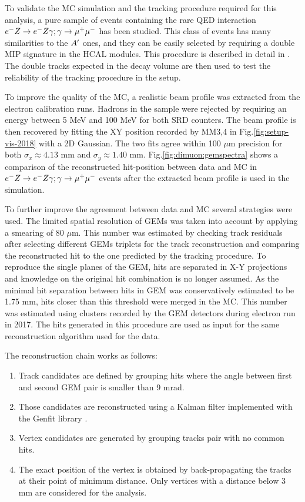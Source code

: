 To validate the MC simulation and the tracking procedure required for this analysis, a pure sample of events containing the rare QED interaction $e^- Z \to e^- Z \gamma; \gamma \to \mu^+ \mu^-$ has been studied. This class of events has many similarities to the $A'$ ones, and they can be easily selected by requiring a double MIP signature in the HCAL modules. This procedure is described in detail in \cite{na64-prd}. The double tracks expected in the decay volume are then used to test the reliability of the tracking procedure in the setup.

To improve the quality of the MC, a realistic beam profile was extracted from the electron calibration runs. Hadrons in the sample were rejected by requiring an energy between 5 MeV and 100 MeV for both SRD counters. The beam profile is then recovered by fitting the XY position recorded by MM3,4 in Fig.\ref{fig:setup-vis-2018} with a 2D Gaussian. The two fits agree within 100 $\mu$m precision for both $\sigma_x \approx 4.13$ mm and $\sigma_y \approx 1.40$ mm. Fig.\ref{fig:dimuon:gemspectra} shows a comparison of the reconstructed hit-position between data and MC in $e^- Z \to e^- Z \gamma; \gamma \to \mu^+ \mu^-$ events after the extracted beam profile is used in the simulation.

To further improve the agreement between data and MC several strategies were used. The limited spatial resolution of GEMs was taken into account by applying a smearing of 80 $\mu$m. This number was estimated by checking track residuals after selecting different GEMs triplets for the track reconstruction and comparing the reconstructed hit to the one predicted by the tracking procedure. To reproduce the single planes of the GEM, hits are separated in X-Y projections and knowledge on the original hit combination is no longer assumed. As the minimal hit separation between hits in GEM was conservatively estimated to be 1.75 mm, hits closer than this threshold were merged in the MC. This number was estimated using clusters recorded by the GEM detectors during electron run in 2017. The hits generated in this procedure are used as input for the same reconstruction algorithm used for the data.

The reconstruction chain works as follows:
\begin{enumerate}
\item Track candidates are defined by grouping hits where the angle between first and second GEM pair is smaller than 9 mrad.
\item Those candidates are reconstructed using a Kalman filter implemented with the Genfit library \cite{genfit}.
\item Vertex candidates are generated by grouping tracks pair with no common hits.
\item The exact position of the vertex is obtained by back-propagating the tracks at their point of minimum distance. Only vertices with a distance below 3 mm are considered for the analysis.
\end{enumerate}

